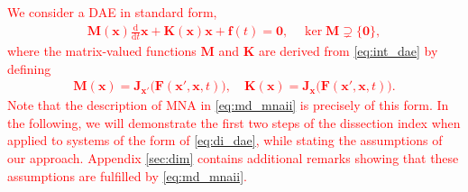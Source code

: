\documentclass[AMA,STIX1COL]{WileyNJD-v2}
\newcommand{\mb}[1]{\mathbf{#1}}
\newcommand{\ddt}{\frac{\mathrm{d}}{\mathrm{d}t}}
\begin{document}
\textcolor{red}{We consider a DAE in standard form\cite{jansen2014},
\begin{align}
    \mb{M}(\mb{x}) \ddt \mb{x} + \mb{K}(\mb{x}) \mb{x} + \mb{f}(t) = \mb{0}, \quad \ker \mb{M} \supsetneq \{ \mb{0} \}, \label{eq:di_dae}
\end{align}
where the matrix-valued functions $\mb{M}$ and $\mb{K}$ are derived from \eqref{eq:int_dae} by defining
\begin{align*}
    \mb{M}(\mb{x}) = \mb{J}_{\mb{x}'} \big( \mb{F}(\mb{x}', \mb{x}, t) \big), \quad \mb{K}(\mb{x}) = \mb{J}_{\mb{x}} \big( \mb{F}(\mb{x}', \mb{x}, t) \big).
\end{align*}
Note that the description of MNA in \eqref{eq:md_mnaii} is precisely of this form. In the following, we will demonstrate the first two steps of the dissection index when applied to systems of the form of \eqref{eq:di_dae}, while stating the assumptions of our approach. Appendix \autoref{sec:dim} contains additional remarks showing that these assumptions are fulfilled by \eqref{eq:md_mnaii}.}
\end{document}
